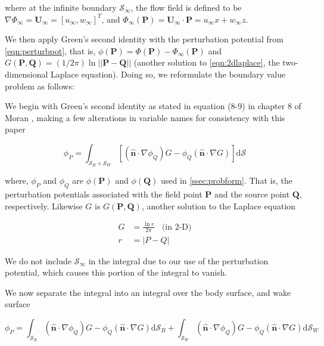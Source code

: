 where at the infinite boundary \( \mathcal{S}_{\infty} \), the flow field is defined to be \( \nabla \Phi_{\infty} = \mathbf{U}_{\infty} = [u_{\infty}, w_{\infty}]^T\), and \( \Phi_{\infty}(\mathbf{P}) = \mathbf{U}_{\infty} \cdot \mathbf{P} = u_{\infty}x + w_{\infty}z\).


We then apply Green's second identity with the perturbation potential from \cref{eqn:perturbpot}, that is, \( \phi(\mathbf{P}) = \Phi(\mathbf{P}) - \Phi_{\infty}(\mathbf{P}) \) and \( G(\mathbf{P},\mathbf{Q}) = (1/2\pi)\ln||\mathbf{P}-\mathbf{Q}|| \) (another solution to \cref{eqn:2dlaplace}, the two-dimensional Laplace equation). Doing so, we reformulate the boundary value problem as follows: 

We begin with Green's second identity as stated in equation (8-9) in chapter 8 of Moran \cite{moran1984}, making a few alterations in variable names for consistency with this paper

\begin{equation}
\phi_P = \int_{\mathcal{S}_B + \mathcal{S}_W} \left[ \left( \mathbf{\hat{n}} \cdot \nabla \phi_Q \right) G - \phi_Q \left( \mathbf{\hat{n}} \cdot \nabla G \right) \right] \mathrm{d} \mathcal{S}
\end{equation}

where, \(\phi_P\) and \(\phi_Q\) are $\phi(\mathbf{P})$ and $\phi(\mathbf{Q})$ used in \cref{ssec:probform}. That is, the perturbation potentials associated with the field point $\mathbf{P}$ and the source point $\mathbf{Q}$, respectively. Likewise $G$ is $G(\mathbf{P},\mathbf{Q})$, another solution to the Laplace equation 

\begin{align}
G &= \frac{\ln{r}}{2\pi}~~~~\text{(in 2-D)}\\
r &= |P-Q|
\end{align}



We do not include \(\mathcal{S}_{\infty}\) in the integral due to our use of the perturbation potential, which causes this portion of the integral to vanish.\cite{moran1984} 

We now separate the integral into an integral over the body surface, and wake surface

\begin{equation}
\phi_P = \int_{\mathcal{S}_B} \left( \mathbf{\hat{n}} \cdot \nabla \phi_Q \right) G - \phi_Q \left( \mathbf{\hat{n}} \cdot \nabla G \right) \mathrm{d} \mathcal{S}_B + \int_{\mathcal{S}_W} \left( \mathbf{\hat{n}} \cdot \nabla \phi_Q \right) G - \phi_Q \left( \mathbf{\hat{n}} \cdot \nabla G \right) \mathrm{d} \mathcal{S}_W
\end{equation}

